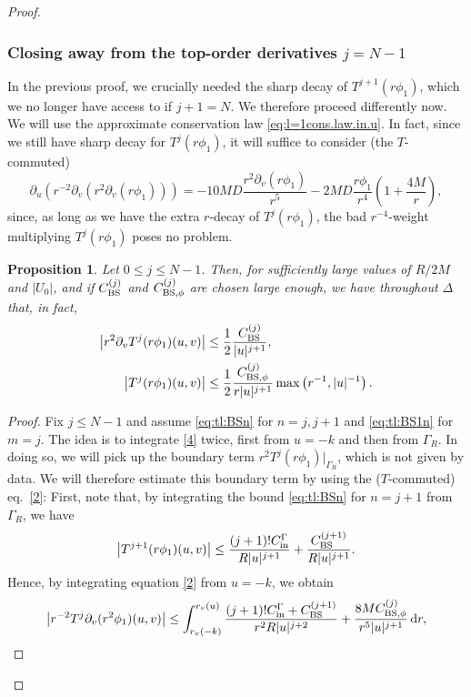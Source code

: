 \documentclass[11pt,english]{article}
\numberwithin{equation}{section}
\theoremstyle{remark}
\theoremstyle{plain}
\newtheorem{prop}{Proposition}[section]
\theoremstyle{remark}
\newcommand{\dd}{\mathop{}\!\mathrm{d}}
\newcommand{\pu}{\partial_u}
\newcommand{\pv}{\partial_v}
\renewcommand{\(}{\left(}
\renewcommand{\)}{\right)}
\newcommand{\pho}{(r\phi_1)}
\begin{document}
\begin{proof}
\subsubsection{Closing away from the top-order derivatives \texorpdfstring{$j= N-1$}{j=N-1}}\label{sec5.3.3}
In the previous proof, we crucially needed the sharp decay of $T^{j+1}\pho$, which we no longer have access to if $j+1=N$. We therefore proceed differently now. We will use the approximate conservation law \eqref{eq:l=1cons.law.in.u}. In fact, since we still have sharp decay for $T^j\pho$, it will suffice to consider (the $T$-commuted)
\begin{equation}\label{4}
\pu(r^{-2}\pv(r^2\pv(r\phi_1)))=-10 MD\frac{r^2\pv(r\phi_1)}{r^5}-2MD\frac{r\phi_1}{r^4}\left(1+\frac{4M}{r}\right),
\end{equation}
since, as long as we have the extra $r$-decay of $T^j\pho$, the bad $r^{-4}$-weight multiplying $T^j\pho$ poses no problem.
\begin{prop}\label{prop:tlbs2}
Let $0\leq j\leq N-1$. Then, for sufficiently large values of $R/2M$ and $|U_0|$, and if $C_{\mathrm{BS}}^{(j)}$ and $C_{\mathrm{BS},\phi}^{(j)}$ are chosen large enough, we have throughout $\Delta$ that, in fact,
  \begin{align}
 \left |r^2\pv T^j (r\phi_1)(u,v)\right|&\leq\frac12 \frac{\cbs^{(j)}}{|u|^{j+1}},\\
 \left |T^j (r\phi_1)(u,v)\right|&\leq\frac12 \frac{\cbsp^{(j)}}{r|u|^{j+1}}\max\left(r^{-1},|u|^{-1}\right).
  \end{align}
\end{prop}
\begin{proof}
Fix $j\leq N-1$ and assume \eqref{eq:tl:BSn} for $n=j,j+1$ and \eqref{eq:tl:BS1n} for $m=j$.
The idea is to integrate \eqref{4} twice, first from $u=-k$ and then from $\Gamma_R$.
In doing so, we will pick up the boundary term $r^2T^j\pho|_{\Gamma_R}$, which is not given by data. 
 We will therefore estimate this boundary term by using the ($T$-commuted) eq.\ \eqref{2}:
First, note that, by integrating the bound  \eqref{eq:tl:BSn} for $n=j+1$ from $\Gamma_R$, we have 
\begin{equation}
\left|T^{j+1}\pho(u,v)\right|\leq \frac{(j+1)!\cin }{R|u|^{j+1}}+\frac{\cbs^{(j+1)}}{R|u|^{j+1}}.
\end{equation}
Hence, by integrating equation \eqref{2} from $u=-k$, we obtain
\begin{align*}
\begin{split}
\left|r^{-2}T^j\pv(r^2\phi_1)(u,v)\right|\leq\int_{r_v(-k)}^{r_v(u)} \frac{(j+1)!\cin+\cbs^{(j+1)}}{r^2R|u|^{j+2}}+\frac{8M\cbsp^{(j)}}{r^5|u|^{j+1}}\dd r,

\end{split}
\end{align*}
\end{proof}
\end{proof}
\end{document}
